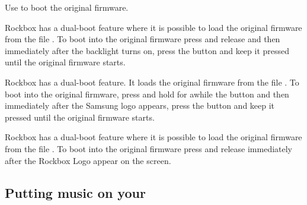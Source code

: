 {  
    {
    Use \ButtonPower{} to boot the original \playerman{} firmware.
    }

    {
    Rockbox has a dual-boot feature where it is possible to load the original firmware from
    the file . To boot into the original firmware press and release
    \ButtonPower{} and then immediately after the backlight turns on, press the \ButtonOK{}
    button and keep it pressed until the original firmware starts.
    }

    {
    Rockbox has a dual-boot feature. It loads the original firmware from
    the file . To boot into the original firmware, press and hold 
    for awhile the \ButtonPlay{} button and then immediately after the Samsung logo appears, 
    press the \ButtonLeft{} button and keep it pressed until the original firmware starts.
    }

    {
    Rockbox has a dual-boot feature where it is possible to load the original firmware from
    the file . To boot into the original firmware press and release
    \ButtonPower{} immediately after the Rockbox Logo appear on the screen.
    }

  }
\subsection{Putting music on your \dap{}}


